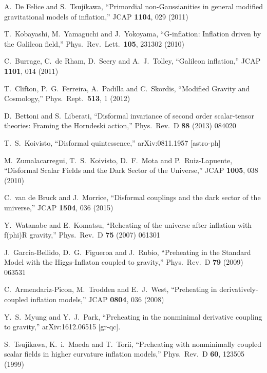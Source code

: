 \documentclass[aps,prd,amsmath,amssymb,preprintnumbers,onecolumn,11pt,nofootinbib]{revtex4}
\begin{document}
\begin{thebibliography}{50}
  A.~De Felice and S.~Tsujikawa, ``Primordial non-Gaussianities in general modified gravitational models of inflation,''
  JCAP {\bf 1104}, 029 (2011)
  
  T.~Kobayashi, M.~Yamaguchi and J.~Yokoyama, ``G-inflation: Inflation driven by the Galileon field,''
  Phys.\ Rev.\ Lett.\  {\bf 105}, 231302 (2010)
  
  C.~Burrage, C.~de Rham, D.~Seery and A.~J.~Tolley, ``Galileon inflation,''
  JCAP {\bf 1101}, 014 (2011)
  
  T.~Clifton, P.~G.~Ferreira, A.~Padilla and C.~Skordis, ``Modified Gravity and Cosmology,''
  Phys.\ Rept.\  {\bf 513}, 1 (2012)
  
  D.~Bettoni and S.~Liberati, ``Disformal invariance of second order scalar-tensor theories: Framing the Horndeski action,''
  Phys.\ Rev.\ D {\bf 88} (2013) 084020

  T.~S.~Koivisto, ``Disformal quintessence,''
  arXiv:0811.1957 [astro-ph]
  
  M.~Zumalacarregui, T.~S.~Koivisto, D.~F.~Mota and P.~Ruiz-Lapuente, ``Disformal Scalar Fields and the Dark Sector of the Universe,''
  JCAP {\bf 1005}, 038 (2010)
  
  C.~van de Bruck and J.~Morrice, ``Disformal couplings and the dark sector of the universe,''
  JCAP {\bf 1504}, 036 (2015)
  
Y.~Watanabe and E.~Komatsu,
``Reheating of the universe after inflation with f(phi)R gravity,''
Phys.\ Rev.\ D {\bf 75} (2007) 061301

  J.~Garcia-Bellido, D.~G.~Figueroa and J.~Rubio, ``Preheating in the Standard Model with the Higgs-Inflaton coupled to gravity,''
  Phys.\ Rev.\ D {\bf 79} (2009) 063531

  C.~Armendariz-Picon, M.~Trodden and E.~J.~West, ``Preheating in derivatively-coupled inflation models,''
  JCAP {\bf 0804}, 036 (2008)
  
  Y.~S.~Myung and Y.~J.~Park, ``Preheating in the nonminimal derivative coupling to gravity,'' arXiv:1612.06515 [gr-qc].
  
  S.~Tsujikawa, K.~i.~Maeda and T.~Torii, ``Preheating with nonminimally coupled scalar fields in higher curvature inflation models,''
  Phys.\ Rev.\ D {\bf 60}, 123505 (1999)


\end{thebibliography}
\end{document}

